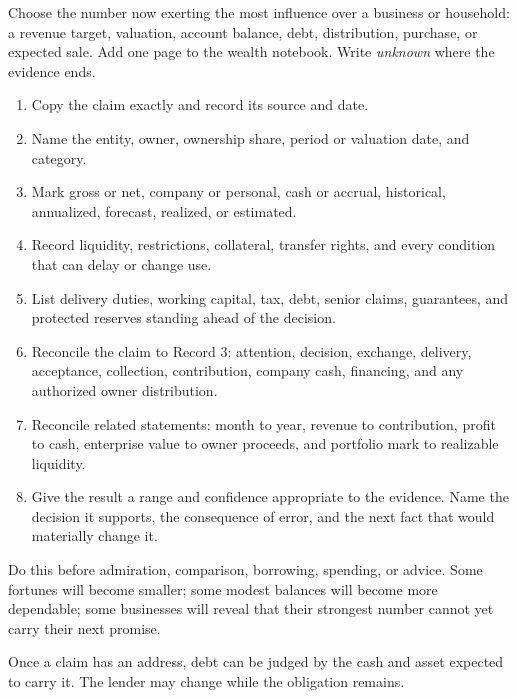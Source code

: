 Choose the number now exerting the most influence over a business or household:
a revenue target, valuation, account balance, debt, distribution, purchase, or
expected sale. Add one page to the wealth notebook. Write \emph{unknown} where
the evidence ends.

\begin{enumerate}[itemsep=0.12em]
\item Copy the claim exactly and record its source and date.
\item Name the entity, owner, ownership share, period or valuation date, and
  category.
\item Mark gross or net, company or personal, cash or accrual, historical,
  annualized, forecast, realized, or estimated.
\item Record liquidity, restrictions, collateral, transfer rights, and every
  condition that can delay or change use.
\item List delivery duties, working capital, tax, debt, senior claims,
  guarantees, and protected reserves standing ahead of the decision.
\item Reconcile the claim to Record 3: attention, decision, exchange, delivery,
  acceptance, collection, contribution, company cash, financing, and any
  authorized owner distribution.
\item Reconcile related statements: month to year, revenue to contribution,
  profit to cash, enterprise value to owner proceeds, and portfolio mark to
  realizable liquidity.
\item Give the result a range and confidence appropriate to the evidence. Name
  the decision it supports, the consequence of error, and the next fact that
  would materially change it.
\end{enumerate}

Do this before admiration, comparison, borrowing, spending, or advice. Some
fortunes will become smaller; some modest balances will become more dependable;
some businesses will reveal that their strongest number cannot yet carry their
next promise.

Once a claim has an address, debt can be judged by the cash and asset expected
to carry it. The lender may change while the obligation remains.
